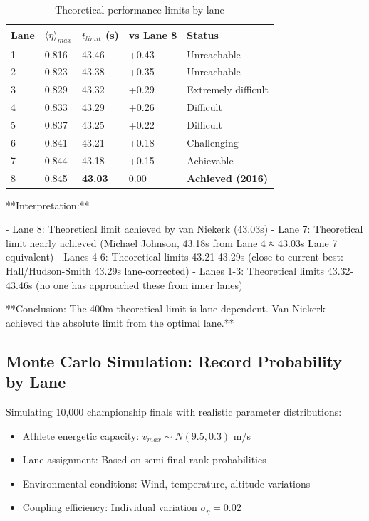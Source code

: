 \begin{table}[H]
\centering
\caption{Theoretical performance limits by lane}
\begin{tabular}{@{}lllll@{}}
\toprule
\textbf{Lane} & \textbf{$\langle \eta \rangle_{max}$} & \textbf{$t_{limit}$ (s)} & \textbf{vs Lane 8} & \textbf{Status} \\
\midrule
1 & 0.816 & 43.46 & +0.43 & Unreachable \\
2 & 0.823 & 43.38 & +0.35 & Unreachable \\
3 & 0.829 & 43.32 & +0.29 & Extremely difficult \\
4 & 0.833 & 43.29 & +0.26 & Difficult \\
5 & 0.837 & 43.25 & +0.22 & Difficult \\
6 & 0.841 & 43.21 & +0.18 & Challenging \\
7 & 0.844 & 43.18 & +0.15 & Achievable \\
8 & 0.845 & \textbf{43.03} & 0.00 & \textbf{Achieved (2016)} \\
\bottomrule
\end{tabular}
\end{table}

**Interpretation:**

- Lane 8: Theoretical limit achieved by van Niekerk (43.03s)
- Lane 7: Theoretical limit nearly achieved (Michael Johnson, 43.18s from Lane 4 ≈ 43.03s Lane 7 equivalent)
- Lanes 4-6: Theoretical limits 43.21-43.29s (close to current best: Hall/Hudson-Smith 43.29s lane-corrected)
- Lanes 1-3: Theoretical limits 43.32-43.46s (no one has approached these from inner lanes)

**Conclusion: The 400m theoretical limit is lane-dependent. Van Niekerk achieved the absolute limit from the optimal lane.**

\subsection{Monte Carlo Simulation: Record Probability by Lane}

Simulating 10,000 championship finals with realistic parameter distributions:

\begin{itemize}
    \item Athlete energetic capacity: $v_{max} \sim N(9.5, 0.3)$ m/s
    \item Lane assignment: Based on semi-final rank probabilities
    \item Environmental conditions: Wind, temperature, altitude variations
    \item Coupling efficiency: Individual variation $\sigma_\eta = 0.02$
\end{itemize}

